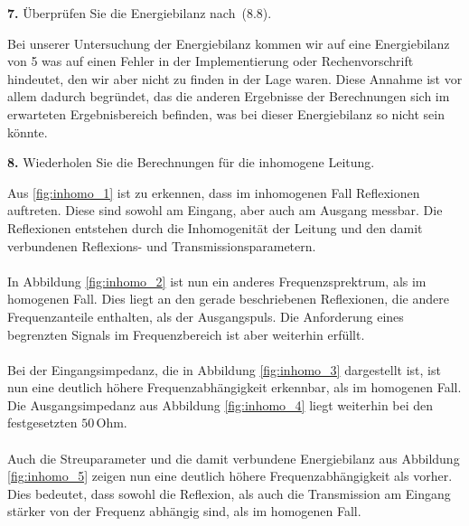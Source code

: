 \documentclass[Protokollheft.tex]{subfiles}
\begin{document}
\begin{framed}
	\noindent \textbf{7.} Überprüfen Sie die Energiebilanz nach~(8.8).\label{exer:checkEnergyBal4TLine}
\end{framed}
\noindent
Bei unserer Untersuchung der Energiebilanz kommen wir auf eine Energiebilanz von 5 was auf einen Fehler in der Implementierung oder Rechenvorschrift hindeutet, den wir aber nicht zu finden in der Lage waren. Diese Annahme ist vor allem dadurch begründet, das die anderen Ergebnisse der Berechnungen sich im erwarteten Ergebnisbereich befinden, was bei dieser Energiebilanz so nicht sein könnte. 

\begin{framed}
	\noindent \textbf{8.} Wiederholen Sie die Berechnungen für die inhomogene Leitung.\label{exer:calc4inhomTLine}
\end{framed}
\noindent
Aus \ref{fig:inhomo_1} ist zu erkennen, dass im inhomogenen Fall Reflexionen auftreten. Diese sind sowohl am Eingang, aber auch am Ausgang messbar. Die Reflexionen entstehen durch die Inhomogenität der Leitung und den damit verbundenen Reflexions- und Transmissionsparametern.\\
\\
In Abbildung \ref{fig:inhomo_2} ist nun ein anderes Frequenzsprektrum, als im homogenen Fall. Dies liegt an den gerade beschriebenen Reflexionen, die andere Frequenzanteile enthalten, als der Ausgangspuls. Die Anforderung eines begrenzten Signals im Frequenzbereich ist aber weiterhin erfüllt.\\
\\
Bei der Eingangsimpedanz, die in Abbildung \ref{fig:inhomo_3} dargestellt ist, ist nun eine deutlich höhere Frequenzabhängigkeit erkennbar, als im homogenen Fall. Die Ausgangsimpedanz aus Abbildung \ref{fig:inhomo_4} liegt weiterhin bei den festgesetzten $50\,$Ohm.\\
\\
Auch die Streuparameter und die damit verbundene Energiebilanz aus Abbildung \ref{fig:inhomo_5} zeigen nun eine deutlich höhere Frequenzabhängigkeit als vorher. Dies bedeutet, dass sowohl die Reflexion, als auch die Transmission am Eingang stärker von der Frequenz abhängig sind, als im homogenen Fall.
\end{document}
